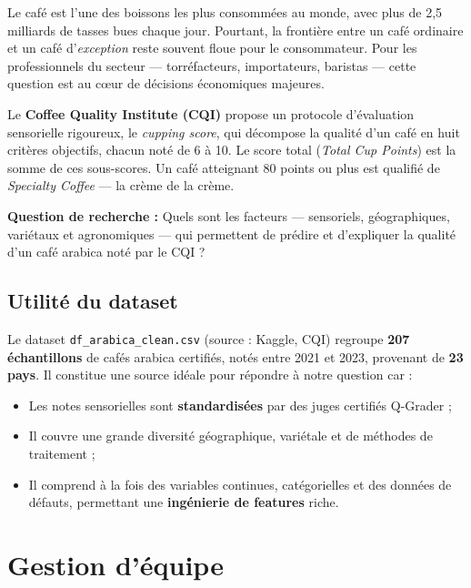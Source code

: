 \documentclass[12pt,a4paper]{article}
\begin{document}
Le café est l'une des boissons les plus consommées au monde, avec plus de 2,5 milliards de tasses
bues chaque jour. Pourtant, la frontière entre un café ordinaire et un café d'\emph{exception}
reste souvent floue pour le consommateur. Pour les professionnels du secteur — torréfacteurs,
importateurs, baristas — cette question est au cœur de décisions économiques majeures.

Le \textbf{Coffee Quality Institute (CQI)} propose un protocole d'évaluation sensorielle
rigoureux, le \emph{cupping score}, qui décompose la qualité d'un café en huit critères objectifs,
chacun noté de 6 à 10. Le score total (\textit{Total Cup Points}) est la somme de ces sous-scores.
Un café atteignant 80 points ou plus est qualifié de \emph{Specialty Coffee} — la crème de la crème.

\begin{insight}
  \textbf{Question de recherche :} Quels sont les facteurs — sensoriels, géographiques,
  variétaux et agronomiques — qui permettent de prédire et d'expliquer la qualité d'un café arabica
  noté par le CQI ?
\end{insight}

\subsection{Utilité du dataset}

Le dataset \texttt{df\_arabica\_clean.csv} (source : Kaggle, CQI) regroupe \textbf{207 échantillons}
de cafés arabica certifiés, notés entre 2021 et 2023, provenant de \textbf{23 pays}.
Il constitue une source idéale pour répondre à notre question car :
\begin{itemize}[noitemsep]
  \item Les notes sensorielles sont \textbf{standardisées} par des juges certifiés Q-Grader ;
  \item Il couvre une grande diversité géographique, variétale et de méthodes de traitement ;
  \item Il comprend à la fois des variables continues, catégorielles et des données de défauts,
        permettant une \textbf{ingénierie de features} riche.
\end{itemize}

\section{Gestion d'équipe}
\end{document}
